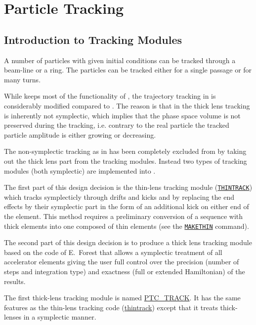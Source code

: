 \chapter{Particle Tracking}
\label{chap:tracking}\label{chap:thintrack}

\section{Introduction to \madx Tracking Modules}
\label{sec:trackintro}

A number of particles with given initial conditions can be tracked
through a beam-line or a ring. The particles can be tracked either for a
single passage or for many turns.  


While \madx keeps most of the functionality of \madeight, the
trajectory tracking in \madx is considerably modified compared to
\madeight. 
The reason is that in \madeight the thick lens tracking is inherently not
symplectic, which implies that the phase space volume is not preserved
during the tracking, i.e. contrary to the real particle the tracked
particle amplitude is either growing or decreasing. 


The non-symplectic tracking as in \madeight has been completely excluded
from \madx by taking out the thick lens part from the tracking
modules. Instead two types of tracking modules (both symplectic) are
implemented into \madx. 


The first part of this design decision is the thin-lens tracking module
(\hyperref[sec:trackoverview]{\texttt{THINTRACK}})  which tracks
symplecticly through drifts and kicks and by replacing the end effects
by their symplectic part in the form of an additional kick on either end of
the element. This method requires a preliminary conversion of a sequence
with thick elements into one composed of thin elements (see the
\hyperref[chap:makethin]{\texttt{MAKETHIN}} command).


The second part of this design decision is to produce a thick lens
tracking module based on the \ptc code of E.~Forest that
allows a symplectic treatment of all accelerator elements giving the
user full control over the precision (number of steps and integration
type) and exactness (full or extended Hamiltonian) of the results. 


The first \ptc thick-lens tracking module is named
\hyperref[sec:ptc-track]{PTC\_TRACK}. 
It has the same features as the thin-lens tracking code
(\hyperref[sec:trackoverview]{thintrack}) except that it
treats thick-lenses in a symplectic manner. 


